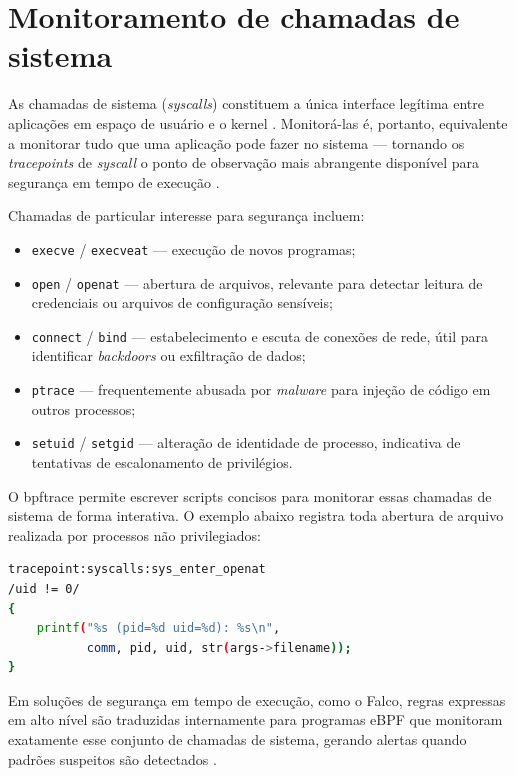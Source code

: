 \section{Monitoramento de chamadas de sistema}

As chamadas de sistema (\textit{syscalls}) constituem a única interface legítima
entre aplicações em espaço de usuário e o kernel \cite{gregg2020}.
Monitorá-las é, portanto, equivalente a monitorar tudo que uma aplicação pode fazer
no sistema — tornando os \textit{tracepoints} de \textit{syscall} o ponto de
observação mais abrangente disponível para segurança em tempo de execução
\cite{gregg2019}.

Chamadas de particular interesse para segurança incluem:

\begin{itemize}
  \item \texttt{execve} / \texttt{execveat} — execução de novos programas;
  \item \texttt{open} / \texttt{openat} — abertura de arquivos, relevante para
        detectar leitura de credenciais ou arquivos de configuração sensíveis;
  \item \texttt{connect} / \texttt{bind} — estabelecimento e escuta de conexões de
        rede, útil para identificar \textit{backdoors} ou exfiltração de dados;
  \item \texttt{ptrace} — frequentemente abusada por \textit{malware} para injeção
        de código em outros processos;
  \item \texttt{setuid} / \texttt{setgid} — alteração de identidade de processo,
        indicativa de tentativas de escalonamento de privilégios.
\end{itemize}

O bpftrace \cite{bpftrace} permite escrever scripts concisos para monitorar essas
chamadas de sistema de forma interativa.
O exemplo abaixo registra toda abertura de arquivo realizada por processos não
privilegiados:

\begin{lstlisting}[language=bash, caption={Script bpftrace para monitorar abertura de arquivos por usuários não-root.}]
tracepoint:syscalls:sys_enter_openat
/uid != 0/
{
    printf("%s (pid=%d uid=%d): %s\n",
           comm, pid, uid, str(args->filename));
}
\end{lstlisting}

Em soluções de segurança em tempo de execução, como o Falco, regras expressas em
alto nível são traduzidas internamente para programas eBPF que monitoram exatamente
esse conjunto de chamadas de sistema, gerando alertas quando padrões suspeitos são
detectados \cite{cassagnes2020}.

